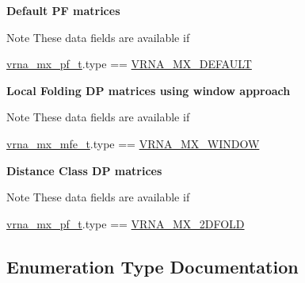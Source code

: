 \begin{Indent}\textbf{ Default PF matrices}\par
{\em \begin{DoxyNote}{Note}
These data fields are available if 
\begin{DoxyCode}
\hyperlink{group__dp__matrices_structvrna__mx__pf__s}{vrna\_mx\_pf\_t}.type == \hyperlink{group__dp__matrices_gga6042ea1d58d01931e959791be6d89343aafa2568956dab79595521e20c49a5f75}{VRNA\_MX\_DEFAULT} 
\end{DoxyCode}
 
\end{DoxyNote}
}\end{Indent}
\begin{Indent}\textbf{ Local Folding DP matrices using window approach}\par
{\em \begin{DoxyNote}{Note}
These data fields are available if 
\begin{DoxyCode}
\hyperlink{group__dp__matrices_structvrna__mx__mfe__s}{vrna\_mx\_mfe\_t}.type == \hyperlink{group__dp__matrices_gga6042ea1d58d01931e959791be6d89343a2ea5d5947f6ec02544934b0ff2785e99}{VRNA\_MX\_WINDOW} 
\end{DoxyCode}
 
\end{DoxyNote}
}\end{Indent}
\begin{Indent}\textbf{ Distance Class DP matrices}\par
{\em \begin{DoxyNote}{Note}
These data fields are available if 
\begin{DoxyCode}
\hyperlink{group__dp__matrices_structvrna__mx__pf__s}{vrna\_mx\_pf\_t}.type == \hyperlink{group__dp__matrices_gga6042ea1d58d01931e959791be6d89343ae656f8391445ff71bed8a597a0a19417}{VRNA\_MX\_2DFOLD} 
\end{DoxyCode}
 
\end{DoxyNote}
}\end{Indent}


\subsection{Enumeration Type Documentation}
\mbox{\label{group__dp__matrices_ga6042ea1d58d01931e959791be6d89343}} 
